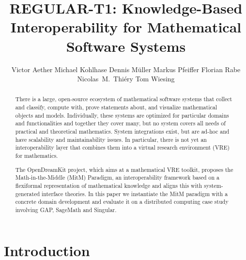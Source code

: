 \documentclass{llncs}
\title{REGULAR-T1: Knowledge-Based Interoperability for Mathematical Software Systems}
\author{
Victor Aether\inst{2} 
 Michael Kohlhase\inst{1} 
Dennis M\"uller\inst{1} 
Markus Pfeiffer\inst{2} 
Florian Rabe\inst{2} 
Nicolas~M.~Thiéry\inst{3} 
Tom Wiesing\inst{2}
}
\institute{
   FAU Erlangen-N\"urnberg
   \and University of St~Andrews 
   \and Universit\'e Paris-Sud
}
\begin{document}
\maketitle
\begin{abstract}
  There is a large, open-source ecosystem of mathematical software systems that collect and
  classify, compute with, prove statements about, and visualize mathematical objects and
  models. Individually, these systems are optimized for particular domains and
  functionalities and together they cover many, but no system covers all needs of
  practical and theoretical mathematics. System integrations exist, but are ad-hoc and
  have scalability and maintainability issues. In particular, there is not yet an
  interoperability layer that combines them into a virtual research environment (VRE) for
  mathematics.
  
  The OpenDreamKit project, which aims at a mathematical VRE toolkit, proposes the
  Math-in-the-Middle (MitM) Paradigm, an interoperability framework based on a flexiformal
  representation of mathematical knowledge and aligns this with system-generated interface
  theories. In this paper we instantiate the MitM paradigm with a concrete domain
  development and evaluate it on a distributed computing case study involving GAP,
  SageMath and Singular. 
\end{abstract}

\section{Introduction}\label{sec:intro}
\end{document}
